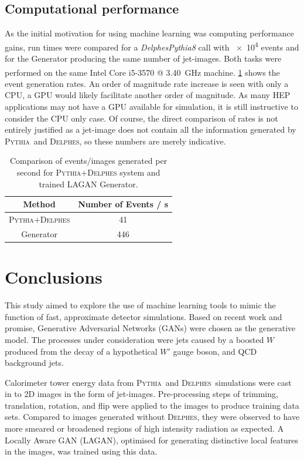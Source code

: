 \documentclass[twocolumn,twoside]{article}
\newcommand{\pkg}[1]{\textsc{#1}}
\newcommand{\pythia}{\pkg{Pythia}}
\newcommand{\delphes}{\pkg{Delphes}}
\begin{document}
\subsection{Computational performance}
\label{sec:comp}

As the initial motivation for using machine learning was computing performance gains, run times were compared for a \textit{DelphesPythia8} call with \num{e4} events and for the Generator producing the same number of jet-images. Both tasks were performed on the same Intel\textsuperscript{\textregistered} Core\textsuperscript{\texttrademark} i5-3570 @ \SI{3.40}{\giga\hertz} machine. \cref{tab:speed} shows the event generation rates. An order of magnitude rate increase is seen with only a CPU, a GPU would likely facilitate another order of magnitude. As many HEP applications may not have a GPU available for simulation, it is still instructive to consider the CPU only case. Of course, the direct comparison of rates is not entirely justified as a jet-image does not contain all the information generated by \pythia~and \delphes, so these numbers are merely indicative.

\begin{table}[H]
	\centering
	\begin{tabular}{cc}
		\toprule Method  & Number of Events / \si{\second} \\
		\midrule \pythia+\delphes  & 41\\
		\midrule Generator  & 446\\
		
		\bottomrule
	\end{tabular}
	\caption{Comparison of events/images generated per second for \pkg{Pythia}+\pkg{Delphes} system and trained LAGAN Generator.}
	\label{tab:speed}
\end{table}
	
\section{Conclusions}
\label{sec:conclusions}
This study aimed to explore the use of machine learning tools to mimic the function of fast, approximate detector simulations. Based on recent work and promise, Generative Adversarial Networks (GANs) were chosen as the generative model. The processes under consideration were jets caused by a boosted $W$ produced from the decay of a hypothetical $W'$ gauge boson, and QCD background jets. 

Calorimeter tower energy data from \pythia~and \delphes~simulations were cast in to 2D images in the form of jet-images. Pre-processing steps of trimming, translation, rotation, and flip were applied to the images to produce training data sets. Compared to images generated without \delphes, they were observed to have more smeared or broadened regions of high intensity radiation as expected. A Locally Aware GAN (LAGAN), optimised for generating distinctive local features in the images, was trained using this data. 
\end{document}

